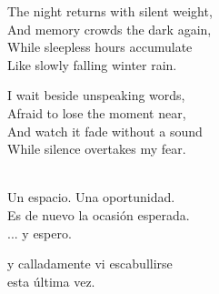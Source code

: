 \begin{lyrics}
The night returns with silent weight,\\
And memory crowds the dark again,\\
While sleepless hours accumulate\\
Like slowly falling winter rain.

I wait beside unspeaking words,\\
Afraid to lose the moment near,\\
And watch it fade without a sound\\
While silence overtakes my fear.

\\
Un espacio. %
Una oportunidad.\\
Es de nuevo la ocasión esperada.\\
... %
y espero.

y calladamente vi escabullirse\\
esta última vez.

\end{lyrics}

